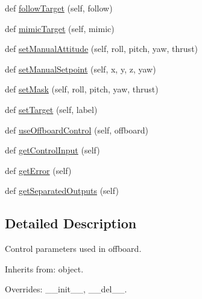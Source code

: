 \begin{DoxyCompactItemize}
\item 
def \mbox{\hyperlink{classwindshape_1_1drone_1_1control_1_1_control_parameters_1_1_control_parameters_a7bd1727e6faf7c0e58aaca96d064e556}{follow\+Target}} (self, follow)
\item 
def \mbox{\hyperlink{classwindshape_1_1drone_1_1control_1_1_control_parameters_1_1_control_parameters_aad3f2cbc6db9cd97d53d9aa0abeae949}{mimic\+Target}} (self, mimic)
\item 
def \mbox{\hyperlink{classwindshape_1_1drone_1_1control_1_1_control_parameters_1_1_control_parameters_a8beda428d67c6d6f9463492048f6f096}{set\+Manual\+Attitude}} (self, roll, pitch, yaw, thrust)
\item 
def \mbox{\hyperlink{classwindshape_1_1drone_1_1control_1_1_control_parameters_1_1_control_parameters_a66fbba348f0ea51b804d239baf53b523}{set\+Manual\+Setpoint}} (self, x, y, z, yaw)
\item 
def \mbox{\hyperlink{classwindshape_1_1drone_1_1control_1_1_control_parameters_1_1_control_parameters_af1aa0f10b5163034eff1ebf50da39b9b}{set\+Mask}} (self, roll, pitch, yaw, thrust)
\item 
def \mbox{\hyperlink{classwindshape_1_1drone_1_1control_1_1_control_parameters_1_1_control_parameters_a51732998311ea9731b447cdd3683170d}{set\+Target}} (self, label)
\item 
def \mbox{\hyperlink{classwindshape_1_1drone_1_1control_1_1_control_parameters_1_1_control_parameters_ac3e8fcfadece2245111f2e2ceb925c83}{use\+Offboard\+Control}} (self, offboard)
\item 
def \mbox{\hyperlink{classwindshape_1_1drone_1_1control_1_1_control_parameters_1_1_control_parameters_acd6778518062207080b29942b7f4db6d}{get\+Control\+Input}} (self)
\item 
def \mbox{\hyperlink{classwindshape_1_1drone_1_1control_1_1_control_parameters_1_1_control_parameters_af13e6505965d33657f24bf0f36397331}{get\+Error}} (self)
\item 
def \mbox{\hyperlink{classwindshape_1_1drone_1_1control_1_1_control_parameters_1_1_control_parameters_a13206892c6ed984100cf7fcb0c37180a}{get\+Separated\+Outputs}} (self)
\end{DoxyCompactItemize}


\subsection{Detailed Description}
\begin{DoxyVerb}Control parameters used in offboard.

Inherits from: object.

Overrides: __init__, __del__.
\end{DoxyVerb}
 

